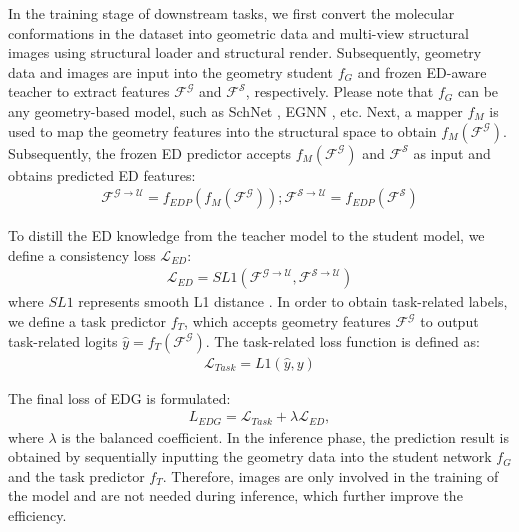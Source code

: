 \documentclass{article}
\begin{document}
In the training stage of downstream tasks, we first convert the molecular conformations in the dataset into geometric data and multi-view structural images using structural loader and structural render. Subsequently, geometry data and images are input into the geometry student $f_{G}$ and frozen ED-aware teacher to extract features $\mathcal{F}^{\mathcal{G}}$ and $\mathcal{F}^{\mathcal{S}}$, respectively. Please note that $f_{G}$ can be any geometry-based model, such as SchNet \cite{schutt2017schnet}, EGNN \cite{satorras2021n}, etc. Next, a mapper $f_M$ is used to map the geometry features into the structural space to obtain $f_M(\mathcal{F}^{\mathcal{G}})$. Subsequently, the frozen ED predictor accepts $f_M(\mathcal{F}^{\mathcal{G}})$ and $\mathcal{F}^{\mathcal{S}}$ as input and obtains predicted ED features:
\begin{align}
\label{Formula_L_align}
\mathcal{F}^{\mathcal{G}\rightarrow\mathcal{U}}=f_{EDP}(f_M(\mathcal{F}^{\mathcal{G}})); \mathcal{F}^{\mathcal{S}\rightarrow\mathcal{U}}=f_{EDP}(\mathcal{F}^{\mathcal{S}})
\end{align}

To distill the ED knowledge from the teacher model to the student model, we define a consistency loss $\mathcal{L}_{ED}$:
\begin{align}
\label{Formula_L_ED}
\mathcal{L}_{ED}=SL1(\mathcal{F}^{\mathcal{G}\rightarrow\mathcal{U}}, \mathcal{F}^{\mathcal{S}\rightarrow\mathcal{U}})
\end{align}
where $SL1$ represents smooth L1 distance \cite{girshick2015fast}. In order to obtain task-related labels, we define a task predictor $f_T$, which accepts geometry features $\mathcal{F}^{\mathcal{G}}$ to output task-related logits $\hat{y}=f_T(\mathcal{F}^{\mathcal{G}})$. The task-related loss function is defined as:
\begin{align}
\label{Formula_L_Task}
\mathcal{L}_{Task}=L1(\hat{y}, y)
\end{align}

The final loss of EDG is formulated:
\begin{align}
\label{Formula_L_ED}
L_{EDG}=\mathcal{L}_{Task}+\lambda\mathcal{L}_{ED},
\end{align}
where $\lambda$ is the balanced coefficient. In the inference phase, the prediction result is obtained by sequentially inputting the geometry data into the student network $f_G$ and the task predictor $f_T$. Therefore, images are only involved in the training of the model and are not needed during inference, which further improve the efficiency.
\end{document}
